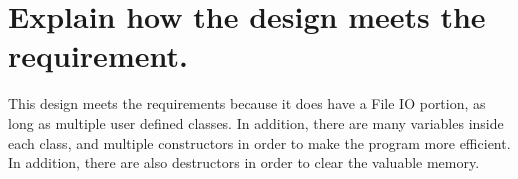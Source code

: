 \documentclass{article}
\begin{document}
\section{Explain how the design meets the requirement.}
This design meets the requirements because it does have a File IO portion, as long as multiple user defined classes. In addition, there are many variables inside each class, and multiple constructors in order to make the program more efficient. In addition, there are also destructors in order to clear the valuable memory.

%
\end{document}
